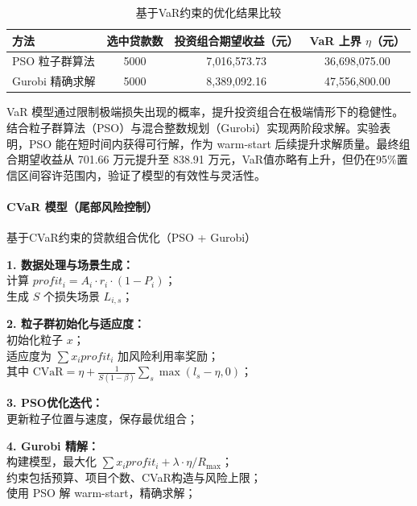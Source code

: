 \documentclass{write_paper}
\begin{document}
\begin{table}[htbp]
\centering
\caption{基于VaR约束的优化结果比较}
\begin{tabular}{lccc}
\toprule
方法 & 选中贷款数 & 投资组合期望收益（元） & VaR 上界 $\eta$（元） \\
\midrule
PSO 粒子群算法 & 5000 & 7,016,573.73 & 36,698,075.00 \\
Gurobi 精确求解 & 5000 & 8,389,092.16 & 47,556,800.00 \\
\bottomrule
\end{tabular}
\label{tab:var-results}
\end{table}

VaR 模型通过限制极端损失出现的概率，提升投资组合在极端情形下的稳健性。结合粒子群算法（PSO）与混合整数规划（Gurobi）实现两阶段求解。实验表明，PSO 能在短时间内获得可行解，作为 warm-start 后续提升求解质量。最终组合期望收益从 701.66 万元提升至 838.91 万元，VaR值亦略有上升，但仍在95\%置信区间容许范围内，验证了模型的有效性与灵活性。

\vspace{1em}
\paragraph{CVaR 模型（尾部风险控制）}

\begin{algorithm}[htbp]
\caption{基于CVaR约束的贷款组合优化（PSO + Gurobi）}

\textbf{1. 数据处理与场景生成：} \\
计算 $profit_i = A_i \cdot r_i \cdot (1 - P_i)$；\\
生成 $S$ 个损失场景 $L_{i,s}$；

\textbf{2. 粒子群初始化与适应度：} \\
初始化粒子 $x$；\\
适应度为 $\sum x_i profit_i$ 加风险利用率奖励；\\
其中 $\text{CVaR} = \eta + \frac{1}{S(1-\beta)} \sum_s \max(l_s - \eta, 0)$；

\textbf{3. PSO优化迭代：} \\
更新粒子位置与速度，保存最优组合；

\textbf{4. Gurobi 精解：} \\
构建模型，最大化 $\sum x_i profit_i + \lambda \cdot \eta / R_{\max}$；\\
约束包括预算、项目个数、CVaR构造与风险上限；\\
使用 PSO 解 warm-start，精确求解；
\end{algorithm}
\end{document}
